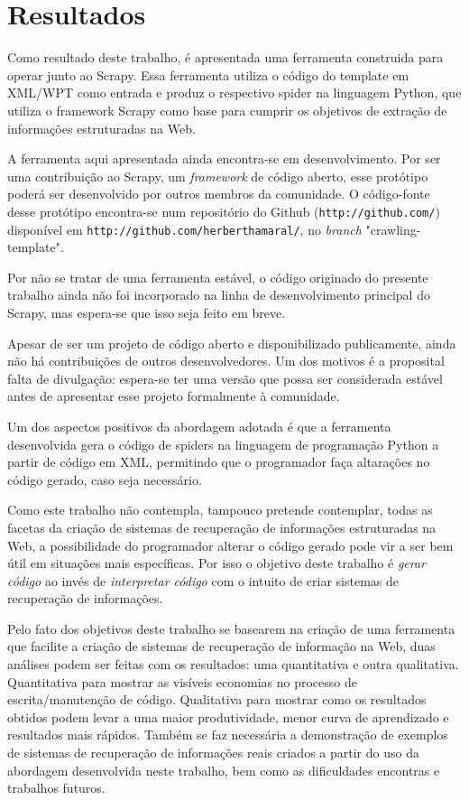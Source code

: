 \chapter{Resultados}
\thispagestyle{fancy}

Como resultado deste trabalho, é apresentada uma ferramenta construida para operar junto ao Scrapy. Essa ferramenta utiliza o código do template em XML/WPT como entrada e produz o respectivo spider na linguagem Python, que utiliza o framework Scrapy como base para cumprir os objetivos de extração de informações estruturadas na Web.


A ferramenta aqui apresentada ainda encontra-se em desenvolvimento. Por ser uma contribuição ao Scrapy, um \textit{framework} de código aberto, esse protótipo poderá ser desenvolvido por outros membros da comunidade. O código-fonte desse protótipo encontra-se num repositório do Github (\texttt{http://github.com/}) disponível em \texttt{http://github.com/herberthamaral/}, no \emph{branch} "crawling-template".

Por não se tratar de uma ferramenta estável, o código originado do presente trabalho ainda não foi incorporado na linha de desenvolvimento principal do Scrapy, mas espera-se que isso seja feito em breve.

Apesar de ser um projeto de código aberto e disponibilizado publicamente, ainda não há contribuições de outros desenvolvedores. Um dos motivos é a proposital falta de divulgação: espera-se ter uma versão que possa ser considerada estável antes de apresentar esse projeto formalmente à comunidade.

Um dos aspectos positivos da abordagem adotada é que a ferramenta desenvolvida gera o código de spiders na linguagem de programação Python a partir de código em XML, permitindo que o programador faça altarações no código gerado, caso seja necessário. 

Como este trabalho não contempla, tampouco pretende contemplar, todas as facetas da criação de sistemas de recuperação de informações estruturadas na Web, a possibilidade do programador alterar o código gerado pode vir a ser bem útil em situações mais específicas. Por isso o objetivo deste trabalho é \emph{gerar código} ao invés de \emph{interpretar código} com o intuito de criar sistemas de recuperação de informações.

Pelo fato dos objetivos deste trabalho se basearem na criação de uma ferramenta que facilite a criação de sistemas de recuperação de informação na Web, duas análises podem ser feitas com os resultados: uma quantitativa e outra qualitativa. Quantitativa para mostrar as visíveis economias no processo de escrita/manutenção de código. Qualitativa para mostrar como os resultados obtidos podem levar a uma maior produtividade, menor curva de aprendizado e resultados mais rápidos. Também se faz necessária a demonstração de exemplos de sistemas de recuperação de informações reais criados a partir do uso da abordagem desenvolvida neste trabalho, bem como as dificuldades encontras e trabalhos futuros.

